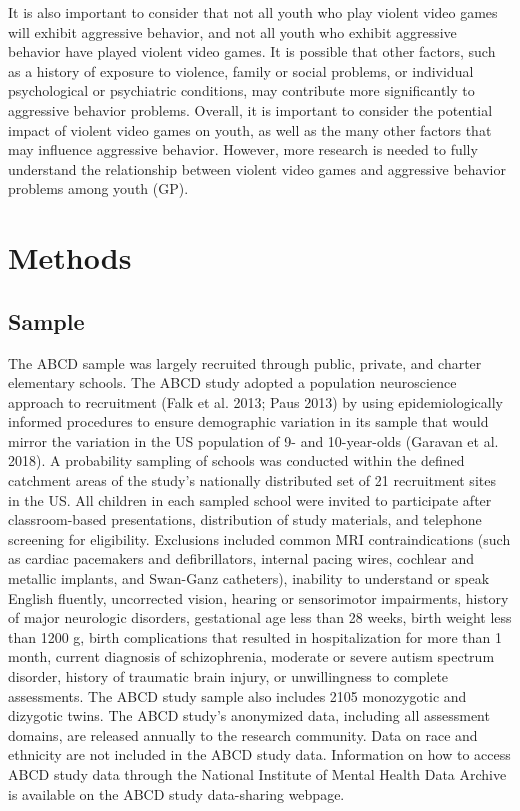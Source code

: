 \documentclass{article}
\begin{document}
It is also important to consider that not all youth who play violent
video games will exhibit aggressive behavior, and not all youth who
exhibit aggressive behavior have played violent video games. It is
possible that other factors, such as a history of exposure to violence,
family or social problems, or individual psychological or psychiatric
conditions, may contribute more significantly to aggressive behavior
problems. Overall, it is important to consider the potential impact of
violent video games on youth, as well as the many other factors that may
influence aggressive behavior. However, more research is needed to fully
understand the relationship between violent video games and aggressive
behavior problems among youth (GP).

\hypertarget{methods}{%
\section{Methods}\label{methods}}

\label{sec:headings}

\hypertarget{sample}{%
\subsection{Sample}\label{sample}}

The ABCD sample was largely recruited through public, private, and
charter elementary schools. The ABCD study adopted a population
neuroscience approach to recruitment (Falk et al. 2013; Paus 2013) by
using epidemiologically informed procedures to ensure demographic
variation in its sample that would mirror the variation in the US
population of 9- and 10-year-olds (Garavan et al. 2018). A probability
sampling of schools was conducted within the defined catchment areas of
the study's nationally distributed set of 21 recruitment sites in the
US. All children in each sampled school were invited to participate
after classroom-based presentations, distribution of study materials,
and telephone screening for eligibility. Exclusions included common MRI
contraindications (such as cardiac pacemakers and defibrillators,
internal pacing wires, cochlear and metallic implants, and Swan-Ganz
catheters), inability to understand or speak English fluently,
uncorrected vision, hearing or sensorimotor impairments, history of
major neurologic disorders, gestational age less than 28 weeks, birth
weight less than 1200 g, birth complications that resulted in
hospitalization for more than 1 month, current diagnosis of
schizophrenia, moderate or severe autism spectrum disorder, history of
traumatic brain injury, or unwillingness to complete assessments. The
ABCD study sample also includes 2105 monozygotic and dizygotic twins.
The ABCD study's anonymized data, including all assessment domains, are
released annually to the research community. Data on race and ethnicity
are not included in the ABCD study data. Information on how to access
ABCD study data through the National Institute of Mental Health Data
Archive is available on the ABCD study data-sharing webpage.
\end{document}
